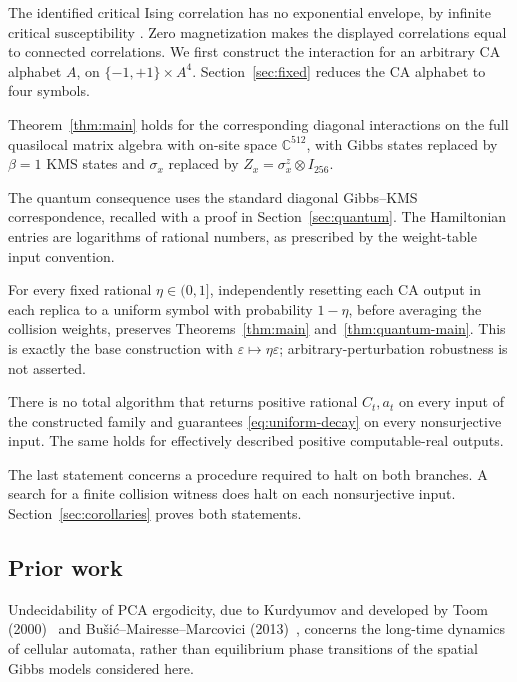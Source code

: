 The identified critical Ising correlation has no exponential envelope, by infinite critical susceptibility \cite[Proposition 2.2]{DCT}. Zero magnetization makes the displayed correlations equal to connected correlations. We first construct the interaction for an arbitrary CA alphabet $A$, on $\{-1,+1\}\times A^4$. Section~\ref{sec:fixed} reduces the CA alphabet to four symbols.

\begin{theoremB}\label{thm:quantum-main}
Theorem~\ref{thm:main} holds for the corresponding diagonal interactions on the full quasilocal matrix algebra with on-site space $\mathbb C^{512}$, with Gibbs states replaced by $\beta=1$ KMS states and $\sigma_x$ replaced by $Z_x=\sigma^z_x\otimes I_{256}$.
\end{theoremB}

The quantum consequence uses the standard diagonal Gibbs--KMS correspondence, recalled with a proof in Section~\ref{sec:quantum}. The Hamiltonian entries are logarithms of rational numbers, as prescribed by the weight-table input convention.

\begin{theoremC}\label{thm:noise-main}
For every fixed rational $\eta\in(0,1]$, independently resetting each CA output in each replica to a uniform symbol with probability $1-\eta$, before averaging the collision weights, preserves Theorems~\ref{thm:main} and~\ref{thm:quantum-main}. This is exactly the base construction with $\varepsilon\mapsto\eta\varepsilon$; arbitrary-perturbation robustness is not asserted.
\end{theoremC}

\begin{theoremD}\label{thm:modulus-main}
There is no total algorithm that returns positive rational $C_t,a_t$ on every input of the constructed family and guarantees \eqref{eq:uniform-decay} on every nonsurjective input. The same holds for effectively described positive computable-real outputs.
\end{theoremD}

The last statement concerns a procedure required to halt on both branches. A search for a finite collision witness does halt on each nonsurjective input. Section~\ref{sec:corollaries} proves both statements.

\subsection{Prior work}
Undecidability of PCA ergodicity, due to Kurdyumov and developed by Toom (2000)~\cite{Toom2000} and Bu\v{s}i\'{c}--Mairesse--Marcovici (2013)~\cite[Theorem 3.3 and Corollary 3.4, preprint numbering]{BMM2013}, concerns the long-time dynamics of cellular automata, rather than equilibrium phase transitions of the spatial Gibbs models considered here.

